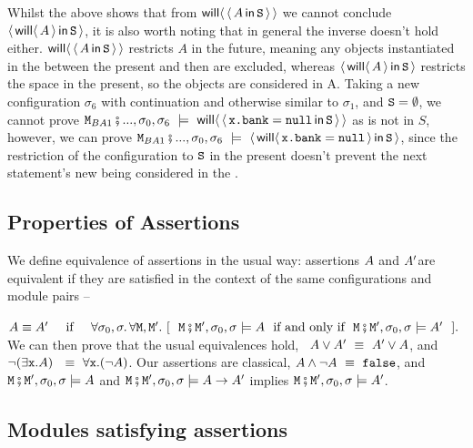 Whilst the above shows that from ${\mathsf{will}}\langle \, \langle\, A\, \mathsf{in}\, {{\mbox{\tt{S}}}}\, \rangle \,\rangle$ we cannot conclude $\langle\,  {\mathsf{will}}\langle \,A\,\rangle \, \mathsf{in}\, {{\mbox{\tt{S}}}}\, \rangle$, it is also worth noting that in general the inverse doesn't hold either. ${\mathsf{will}}\langle \, \langle\, A\, \mathsf{in}\, {{\mbox{\tt{S}}}}\, \rangle \,\rangle$ restricts $A$ in the future, meaning any objects instantiated in the between the present and then are excluded, whereas $\langle\,  {\mathsf{will}}\langle \,A\,\rangle \, \mathsf{in}\, {{\mbox{\tt{S}}}}\, \rangle$ restricts the space in the present, so the objects are considered in A. Taking a new configuration $\sigma_6$  with continuation  and otherwise similar to $\sigma_1$, and ${{\mbox{\tt{S}}}} = \emptyset$, we cannot prove $\M_{BA1}\mkpair ..., \sigma_0 , \sigma_6 \ \models \ \Future{ \Using { \prg{x.bank} = \prg{null} } {\SF}}$  as  is not in $S$, however, we can prove ${\mbox{\tt{\ensuremath{{\mbox{\tt{M}}}}}}}_{BA1}\fatsemi ..., \sigma_0 , \sigma_6 \ \models \ \langle\,  {\mathsf{will}}\langle \, {\mbox{\tt{x.bank}}} = {\mbox{\tt{null}}} \,\rangle \, \mathsf{in}\, {{\mbox{\tt{S}}}}\, \rangle$, since the restriction of the configuration to ${{\mbox{\tt{S}}}}$ in the present doesn't prevent the next statement's new  being considered in the \Future{\cdot}.


\subsection{Properties of Assertions}

 
\label{sect:classical} 
We define equivalence of   assertions in the usual way: assertions $A$ and $A'$are equivalent if they are satisfied  in
the context of the same configurations and module pairs -- \ie\\
 \strut{} \hspace{1.1cm} $\A \equiv \A'\  \IFF\    \forall \sigma_0, \sigma.\, \forall \M, \M'. \ [\ \ \M\mkpair \M', \sigma_0,\sigma \models \A\ \mbox{ if and only if }\ \M\mkpair \M', \sigma_0,\sigma \models \A'\ \ ].$\\
We can then prove that the usual equivalences hold, \eg\  $ A \vee A' \ \equiv \  A' \vee A$, and\   $\neg (\exists {\mbox{\tt{x}}}.A )  \  \ \equiv \  \forall {\mbox{\tt{x}}}.(\neg  A)$.
%
Our assertions are classical, \eg  $ A \wedge\neg A \ \equiv \  {\mbox{\tt{false}}}$, and ${\mbox{\tt{\ensuremath{{\mbox{\tt{M}}}}}}}\fatsemi {\mbox{\tt{\ensuremath{{\mbox{\tt{M}}}}}}}', \sigma_0 , \sigma  \models A$ and  ${\mbox{\tt{\ensuremath{{\mbox{\tt{M}}}}}}}\fatsemi {\mbox{\tt{\ensuremath{{\mbox{\tt{M}}}}}}}', \sigma_0 , \sigma  \models A \rightarrow A'$  implies
${\mbox{\tt{\ensuremath{{\mbox{\tt{M}}}}}}}\fatsemi {\mbox{\tt{\ensuremath{{\mbox{\tt{M}}}}}}}', \sigma_0 , \sigma  \models A '$. 

\subsection{Modules satisfying assertions}

